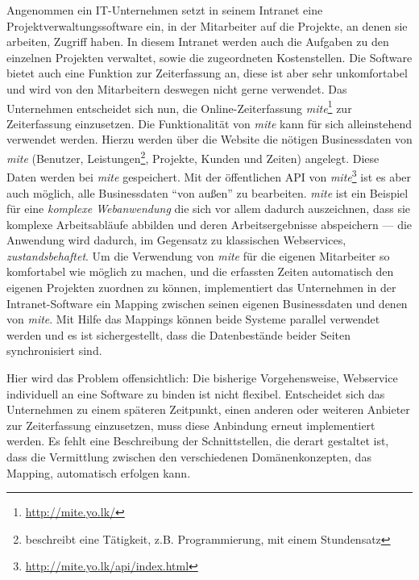 Angenommen ein IT-Unternehmen setzt in seinem Intranet eine Projektverwaltungssoftware ein, in der Mitarbeiter auf die Projekte, an denen sie arbeiten, Zugriff haben. In diesem Intranet werden auch die Aufgaben zu den einzelnen Projekten verwaltet, sowie die zugeordneten Kostenstellen. Die Software bietet auch eine Funktion zur Zeiterfassung an, diese ist aber sehr unkomfortabel und wird von den Mitarbeitern deswegen nicht gerne verwendet. Das Unternehmen entscheidet sich nun, die Online-Zeiterfassung  \emph{mite}\footnote{\url{http://mite.yo.lk/}} zur Zeiterfassung einzusetzen. Die Funktionalität von \emph{mite} kann für sich alleinstehend verwendet werden. Hierzu werden über die Website die nötigen Businessdaten von \emph{mite} (Benutzer, Leistungen\footnote{beschreibt eine Tätigkeit, z.B. Programmierung, mit einem Stundensatz}, Projekte, Kunden und Zeiten) angelegt. Diese Daten werden bei \emph{mite} gespeichert. Mit der öffentlichen API von \emph{mite}\footnote{\url{http://mite.yo.lk/api/index.html}} ist es aber auch möglich, alle Businessdaten "`von außen"' zu bearbeiten. \emph{mite} ist ein Beispiel für eine \emph{komplexe Webanwendung} die sich vor allem dadurch auszeichnen, dass sie komplexe Arbeitsabläufe abbilden und deren Arbeitsergebnisse abspeichern --- die Anwendung wird dadurch, im Gegensatz zu klassischen Webservices, \emph{zustandsbehaftet}. Um die Verwendung von \emph{mite} für die eigenen Mitarbeiter so komfortabel wie möglich zu machen, und die erfassten Zeiten automatisch den eigenen Projekten zuordnen zu können, implementiert das Unternehmen in der Intranet-Software ein Mapping zwischen seinen eigenen Businessdaten und denen von \emph{mite}. Mit Hilfe das Mappings können beide Systeme parallel verwendet werden und es ist sichergestellt, dass die Datenbestände beider Seiten synchronisiert sind. 

Hier wird das Problem offensichtlich: Die bisherige Vorgehensweise, Webservice individuell an eine Software zu binden ist nicht flexibel. Entscheidet sich das Unternehmen zu einem späteren Zeitpunkt, einen anderen oder weiteren Anbieter zur Zeiterfassung einzusetzen, muss diese Anbindung erneut implementiert werden. Es fehlt eine Beschreibung der Schnittstellen, die derart gestaltet ist, dass die Vermittlung zwischen den verschiedenen Domänenkonzepten, das Mapping, automatisch erfolgen kann. 

